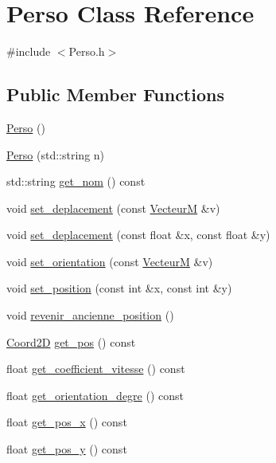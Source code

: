 \hypertarget{classPerso}{}\section{Perso Class Reference}
\label{classPerso}


{\ttfamily \#include $<$Perso.\+h$>$}

\subsection*{Public Member Functions}
\begin{DoxyCompactItemize}
\item 
\hyperlink{classPerso_a33aebfa5c1b957d87f81da39536121e8}{Perso} ()
\item 
\hyperlink{classPerso_a25afa33fb28da6526c48cca6d96cb65c}{Perso} (std\+::string n)
\item 
std\+::string \hyperlink{classPerso_a33d916b6f92b8dace29b86ef42b55de0}{get\+\_\+nom} () const 
\item 
void \hyperlink{classPerso_aee94c6fa0d07ebe5d27207aa11552a22}{set\+\_\+deplacement} (const \hyperlink{classVecteurM}{VecteurM} \&v)
\item 
void \hyperlink{classPerso_a37854611430566f2c7443daa67cc9acb}{set\+\_\+deplacement} (const float \&x, const float \&y)
\item 
void \hyperlink{classPerso_abd42a00f2f2110cadc68001e570ae3f7}{set\+\_\+orientation} (const \hyperlink{classVecteurM}{VecteurM} \&v)
\item 
void \hyperlink{classPerso_a61086cee36d4adf7f95b6eab8c2a0016}{set\+\_\+position} (const int \&x, const int \&y)
\item 
void \hyperlink{classPerso_a7ccf761bd7df818e304713fe117ec4d1}{revenir\+\_\+ancienne\+\_\+position} ()
\item 
\hyperlink{classCoord2D}{Coord2D} \hyperlink{classPerso_a5190c85261ab0e6f5825b1a5d23042f7}{get\+\_\+pos} () const 
\item 
float \hyperlink{classPerso_aa8d8bea99ce43e44a071e0d773356fd2}{get\+\_\+coefficient\+\_\+vitesse} () const 
\item 
float \hyperlink{classPerso_a681288fec10d471d95374488c63b9a77}{get\+\_\+orientation\+\_\+degre} () const 
\item 
float \hyperlink{classPerso_ab03b733beb68cf443e281ee1272b56df}{get\+\_\+pos\+\_\+x} () const 
\item 
float \hyperlink{classPerso_a3c38e53fa260249c5b97bd0926442958}{get\+\_\+pos\+\_\+y} () const 

\end{DoxyCompactItemize}
